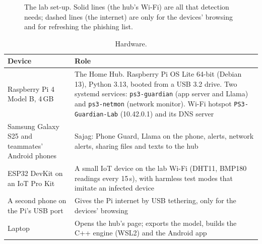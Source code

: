 \documentclass[11pt,a4paper]{article}
\newcommand{\code}[1]{\texttt{#1}}
\begin{document}
\begin{figure}[H]
\centering
{}
\caption{The lab set-up. Solid lines (the hub's Wi-Fi) are all that detection needs; dashed lines (the
internet) are only for the devices' browsing and for refreshing the phishing list.}
\label{fig:where}
\end{figure}

\begin{table}[H]
\centering\small
\begin{tabularx}{\textwidth}{@{}>{\raggedright\arraybackslash}p{4.2cm}X@{}}
\toprule
\textbf{Device} & \textbf{Role}\\
\midrule
Raspberry Pi 4 Model B, 4\,GB & The Home Hub. Raspberry Pi OS Lite 64-bit (Debian 13), Python 3.13, booted from a USB 3.2 drive. Two systemd services: \code{ps3-guardian} (app server and Llama) and \code{ps3-netmon} (network monitor). Wi-Fi hotspot \code{PS3-Guardian-Lab} (10.42.0.1) and its DNS server\\
Samsung Galaxy S25 and teammates' Android phones & Sajag: Phone Guard, Llama on the phone, alerts, network alerts, sharing files and texts to the hub\\
ESP32 DevKit on an IoT Pro Kit & A small IoT device on the lab Wi-Fi (DHT11, BMP180 readings every 15\,s), with harmless test modes that imitate an infected device\\
A second phone on the Pi's USB port & Gives the Pi internet by USB tethering, only for the devices' browsing\\
Laptop & Opens the hub's page; exports the model, builds the C++ engine (WSL2) and the Android app\\
\bottomrule
\end{tabularx}
\caption{Hardware.}
\end{table}
\end{document}
